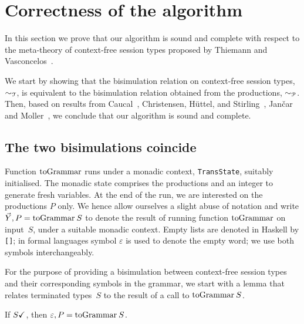 \section{Correctness of the algorithm}
\label{sec:soundness}

In this section we prove that our algorithm is sound and complete
with respect to the meta-theory of context-free session types proposed
by Thiemann and Vasconcelos~\cite{thiemann2016context}.

We start by showing that the bisimulation relation on context-free
session types, $\sim_\mathcal T$, is equivalent to the bisimulation
relation obtained from the productions, $\sim_\mathcal P$.  Then, based on
results from Caucal~\cite{caucal1986decidabilite}, Christensen,
H{\"{u}}ttel, and Stirling~\cite{DBLP:journals/iandc/ChristensenHS95},
Jan{\v{c}}ar and Moller~\cite{janvcar1999techniques}, we conclude that
our algorithm is sound and complete.

\subsection{The two bisimulations coincide}

Function $\toGrammark$ runs under a monadic context,
\lstinline|TransState|, suitably initialised.
%
The monadic state comprises the productions and an integer to generate
fresh variables. At the end of the run, we are interested on the
productions $P$ only.
%
We hence allow ourselves a slight abuse of notation and write
$\vec Y,P = \toGrammarf S$ to denote the result of running function
$\toGrammark$ on input~$S$, under a suitable monadic context.
%
Empty lists are denoted in Haskell by \lstinline|[]|;
in formal languages symbol $\varepsilon$ is used to denote the empty
word; we use both symbols interchangeably.


For the purpose of providing a bisimulation between context-free
session types and their corresponding symbols in the grammar, we start
with a lemma that relates terminated types~$S$ to the result of a call
to $\toGrammarf S$.

\begin{lemma}
  \label{lem:terminated-togrammar}
  If $S\checkmark$, then $\varepsilon,P=\toGrammarf S$.
\end{lemma}

